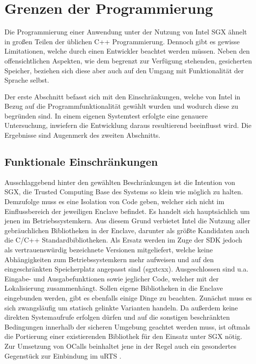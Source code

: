 \section{Grenzen der Programmierung}

Die Programmierung einer Anwendung unter der Nutzung von Intel \ac{SGX} ähnelt in großen Teilen der üblichen C++ Programmierung. Dennoch gibt es gewisse Limitationen, welche durch einen Entwickler beachtet werden müssen. Neben den offensichtlichen Aspekten, wie dem begrenzt zur Verfügung stehenden, gesicherten Speicher, beziehen sich diese aber auch auf den Umgang mit Funktionalität der Sprache selbst. 

Der erste Abschnitt befasst sich mit den Einschränkungen, welche von Intel in Bezug auf die Programmfunktionalität gewählt wurden und wodurch diese zu begründen sind. In einem eigenen Systemtest erfolgte eine genauere Untersuchung, inwiefern die Entwicklung daraus resultierend beeinflusst wird. Die Ergebnisse sind Augenmerk des zweiten Abschnitts.

\subsection{Funktionale Einschränkungen}

Ausschlaggebend hinter den gewählten Beschränkungen ist die Intention von \ac{SGX}, die Trusted Computing Base des Systems so klein wie möglich zu halten. Demzufolge muss es eine Isolation von Code geben, welcher sich nicht im Einflussbereich der jeweiligen Enclave befindet. Es handelt sich hauptsächlich um jenen im Betriebssystemkern. Aus diesem Grund verbietet Intel die Nutzung aller gebräuchlichen Bibliotheken in der Enclave, darunter als größte Kandidaten auch die C/C++ Standardbibliotheken. Als Ersatz werden im Zuge der \ac{SDK} jedoch als vertrauenswürdig bezeichnete Versionen mitgeliefert, welche keine Abhängigkeiten zum Betriebssystemkern mehr aufweisen und auf den eingeschränkten Speicherplatz angepasst sind (sgx\textunderscore tcxx). Ausgeschlossen sind u.a. Eingabe- und Ausgabefunktionen sowie jeglicher Code, welcher mit der Lokalisierung zusammenhängt. Sollen eigene Bibliotheken in die Enclave eingebunden werden, gibt es ebenfalls einige Dinge zu beachten. Zunächst muss es sich zwangsläufig um statisch gelinkte Varianten handeln. Da außerdem keine direkten Systemaufrufe erfolgen dürfen und auf die sonstigen beschränkten Bedingungen innerhalb der sicheren Umgebung geachtet werden muss, ist oftmals die Portierung einer existierenden Bibliothek für den Einsatz unter \ac{SGX} nötig. Zur Umsetzung von \acp{OCall} beinhaltet jene in der Regel auch ein gesondertes Gegenstück zur Einbindung im \ac{uRTS} \cite{LinuxGuide}.
 
